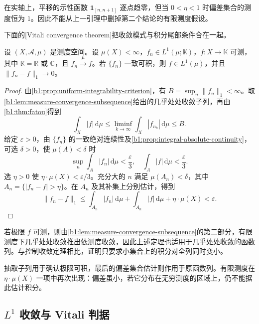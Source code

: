 在实轴上，平移的示性函数 \(\mathbf 1_{[n,n+1]}\) 逐点趋零，但当 \(0<\eta<1\) 时偏差集合的测度恒为 \(1\)。因此不能从上一引理中删掉第二个结论的有限测度假设。

\ProseParagraphBreak

下面的[Vitali convergence theorem]把收敛模式与积分尾部条件合在一起。

\begin{theorem}[Vitali 收敛]
\label{b1:thm:vitali-convergence}
设 \((X,\mathcal A,\mu)\) 是测度空间。设 \(\mu(X)<\infty\)，\(f_n\in L^1(\mu;\mathbb K)\)，\(f:X\to\mathbb K\) 可测，其中 \(\mathbb K=\mathbb R\) 或 \(\mathbb C\)，且 \(f_n\xrightarrow{\mu}f\)。若 \(\{f_n\}\) 一致可积，则 \(f\in L^1(\mu)\)，并且 \(\|f_n-f\|_1\to0\)。
\end{theorem}

\begin{proof}
由\cref{b1:prop:uniform-integrability-criterion}，有 \(B=\sup_n\|f_n\|_1<\infty\)。取\cref{b1:lem:measure-convergence-subsequence}给出的几乎处处收敛子列，再由\cref{b1:thm:fatou}得到
\[
\int_X|f|\,\mathrm d\mu
\leq\liminf_{k\to\infty}\int_X|f_{n_k}|\,\mathrm d\mu
\leq B.
\]
给定 \(\varepsilon>0\)，由 \(\{f_n\}\) 的一致绝对连续性及\cref{b1:prop:integral-absolute-continuity}，可选 \(\delta>0\)，使 \(\mu(A)<\delta\) 时
\[
\sup_n\int_A|f_n|\,\mathrm d\mu<\frac{\varepsilon}{3},
\quad\int_A|f|\,\mathrm d\mu<\frac{\varepsilon}{3}.
\]
选 \(\eta>0\) 使 \(\eta\cdot\mu(X)<\varepsilon/3\)。充分大的 \(n\) 满足 \(\mu(A_n)<\delta\)，其中 \(A_n=\{|f_n-f|>\eta\}\)。在 \(A_n\) 及其补集上分别估计，得到
\[
\|f_n-f\|_1
\leq\int_{A_n}|f_n|\,\mathrm d\mu+\int_{A_n}|f|\,\mathrm d\mu
+\eta\cdot\mu(X)<\varepsilon.
\]
\end{proof}

若极限 \(f\) 可测，则由\cref{b1:lem:measure-convergence-subsequence}的第二部分，有限测度下几乎处处收敛推出依测度收敛，因此上述定理也适用于几乎处处收敛的函数列。与控制收敛定理相比，证明只要求小集合上的积分对全列同时变小。

\ProseParagraphBreak

抽取子列用于确认极限可积，最后的偏差集合估计则作用于原函数列。有限测度在 \(\eta\cdot\mu(X)\) 一项中再次出现：偏差虽小，若它分布在无穷测度的区域上，仍不能据此估计积分。

\subsection{\texorpdfstring{\(L^1\)}{L1} 收敛与 Vitali 判据}
\label{b1:subsec:050504}

